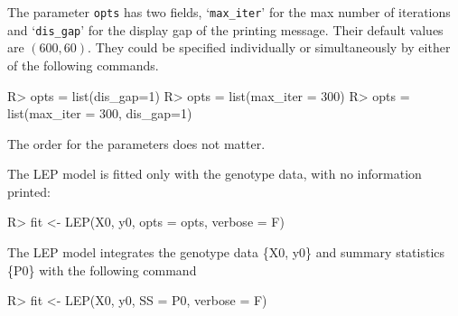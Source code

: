 \documentclass[11pt]{article}
\begin{document}
The parameter \texttt{opts} has two fields, `\texttt{max\_iter}' for the max number of iterations and `\texttt{dis\_gap}' for the display gap of the printing message. Their default values are $(600,60)$. They could be specified individually or simultaneously by either of the following commands.
\begin{Schunk}
\begin{Sinput}
R> opts = list(dis_gap=1)
R> opts = list(max_iter = 300)
R> opts = list(max_iter = 300, dis_gap=1)
\end{Sinput}
\end{Schunk}
The order for the parameters does not matter.


The LEP model is fitted only with the genotype data, with no information printed:
\begin{Schunk}
\begin{Sinput}
R> fit <- LEP(X0, y0, opts = opts, verbose = F)
\end{Sinput}
\end{Schunk}

The LEP model integrates the genotype data \{X0, y0\} and summary statistics \{P0\} with the following command
\begin{Schunk}
\begin{Sinput}
R> fit <- LEP(X0, y0, SS = P0, verbose = F)
\end{Sinput}
\end{Schunk}
\end{document}
